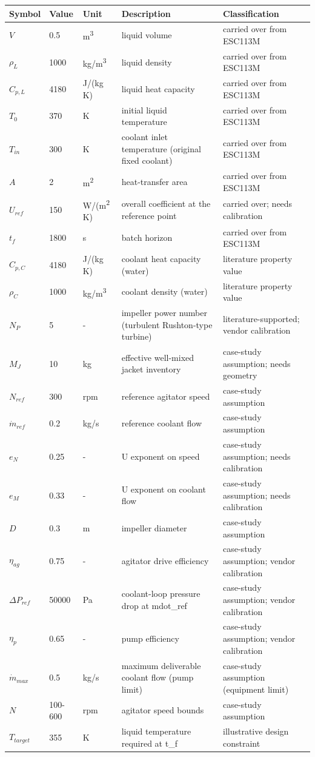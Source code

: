 \begin{tabular}{lllp{4.3cm}p{4.3cm}}
\toprule
Symbol & Value & Unit & Description & Classification \\
\midrule
$V$ & 0.5 & m\textsuperscript{3} & liquid volume & carried over from ESC113M \\
$\rho_L$ & 1000 & kg/m\textsuperscript{3} & liquid density & carried over from ESC113M \\
$C_{p,L}$ & 4180 & J/(kg K) & liquid heat capacity & carried over from ESC113M \\
$T_0$ & 370 & K & initial liquid temperature & carried over from ESC113M \\
$T_{in}$ & 300 & K & coolant inlet temperature (original fixed coolant) & carried over from ESC113M \\
$A$ & 2 & m\textsuperscript{2} & heat-transfer area & carried over from ESC113M \\
$U_{ref}$ & 150 & W/(m\textsuperscript{2} K) & overall coefficient at the reference point & carried over; needs calibration \\
$t_f$ & 1800 & s & batch horizon & carried over from ESC113M \\
$C_{p,C}$ & 4180 & J/(kg K) & coolant heat capacity (water) & literature property value \\
$\rho_C$ & 1000 & kg/m\textsuperscript{3} & coolant density (water) & literature property value \\
$N_P$ & 5 & - & impeller power number (turbulent Rushton-type turbine) & literature-supported; vendor calibration \\
$M_J$ & 10 & kg & effective well-mixed jacket inventory & case-study assumption; needs geometry \\
$N_{ref}$ & 300 & rpm & reference agitator speed & case-study assumption \\
$\dot m_{ref}$ & 0.2 & kg/s & reference coolant flow & case-study assumption \\
$e_N$ & 0.25 & - & U exponent on speed & case-study assumption; needs calibration \\
$e_M$ & 0.33 & - & U exponent on coolant flow & case-study assumption; needs calibration \\
$D$ & 0.3 & m & impeller diameter & case-study assumption \\
$\eta_{ag}$ & 0.75 & - & agitator drive efficiency & case-study assumption; vendor calibration \\
$\Delta P_{ref}$ & 50000 & Pa & coolant-loop pressure drop at mdot\_ref & case-study assumption; vendor calibration \\
$\eta_p$ & 0.65 & - & pump efficiency & case-study assumption; vendor calibration \\
$\dot m_{max}$ & 0.5 & kg/s & maximum deliverable coolant flow (pump limit) & case-study assumption (equipment limit) \\
$N$ & 100-600 & rpm & agitator speed bounds & case-study assumption \\
$T_{target}$ & 355 & K & liquid temperature required at t\_f & illustrative design constraint \\
\bottomrule
\end{tabular}
